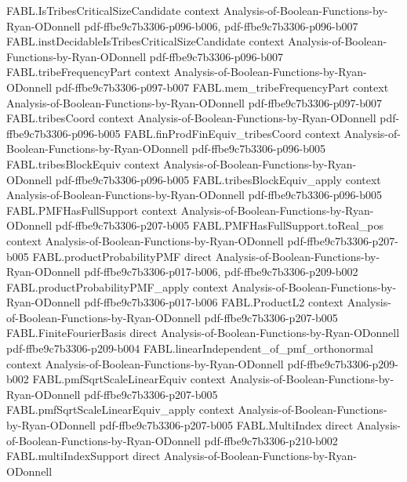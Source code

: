 \begin{theorem}
\proofstep
  {FABL.IsTribesCriticalSizeCandidate}
  {context}
  {Analysis-of-Boolean-Functions-by-Ryan-ODonnell}
  {pdf-ffbe9c7b3306-p096-b006,
    pdf-ffbe9c7b3306-p096-b007}
\proofstep
  {FABL.instDecidableIsTribesCriticalSizeCandidate}
  {context}
  {Analysis-of-Boolean-Functions-by-Ryan-ODonnell}
  {pdf-ffbe9c7b3306-p096-b007}
\proofstep
  {FABL.tribeFrequencyPart}
  {context}
  {Analysis-of-Boolean-Functions-by-Ryan-ODonnell}
  {pdf-ffbe9c7b3306-p097-b007}
\proofstep
  {FABL.mem_tribeFrequencyPart}
  {context}
  {Analysis-of-Boolean-Functions-by-Ryan-ODonnell}
  {pdf-ffbe9c7b3306-p097-b007}
\proofstep
  {FABL.tribesCoord}
  {context}
  {Analysis-of-Boolean-Functions-by-Ryan-ODonnell}
  {pdf-ffbe9c7b3306-p096-b005}
\proofstep
  {FABL.finProdFinEquiv_tribesCoord}
  {context}
  {Analysis-of-Boolean-Functions-by-Ryan-ODonnell}
  {pdf-ffbe9c7b3306-p096-b005}
\proofstep
  {FABL.tribesBlockEquiv}
  {context}
  {Analysis-of-Boolean-Functions-by-Ryan-ODonnell}
  {pdf-ffbe9c7b3306-p096-b005}
\proofstep
  {FABL.tribesBlockEquiv_apply}
  {context}
  {Analysis-of-Boolean-Functions-by-Ryan-ODonnell}
  {pdf-ffbe9c7b3306-p096-b005}
\proofstep
  {FABL.PMFHasFullSupport}
  {context}
  {Analysis-of-Boolean-Functions-by-Ryan-ODonnell}
  {pdf-ffbe9c7b3306-p207-b005}
\proofstep
  {FABL.PMFHasFullSupport.toReal_pos}
  {context}
  {Analysis-of-Boolean-Functions-by-Ryan-ODonnell}
  {pdf-ffbe9c7b3306-p207-b005}
\proofstep
  {FABL.productProbabilityPMF}
  {direct}
  {Analysis-of-Boolean-Functions-by-Ryan-ODonnell}
  {pdf-ffbe9c7b3306-p017-b006,
    pdf-ffbe9c7b3306-p209-b002}
\proofstep
  {FABL.productProbabilityPMF_apply}
  {context}
  {Analysis-of-Boolean-Functions-by-Ryan-ODonnell}
  {pdf-ffbe9c7b3306-p017-b006}
\proofstep
  {FABL.ProductL2}
  {context}
  {Analysis-of-Boolean-Functions-by-Ryan-ODonnell}
  {pdf-ffbe9c7b3306-p207-b005}
\proofstep
  {FABL.FiniteFourierBasis}
  {direct}
  {Analysis-of-Boolean-Functions-by-Ryan-ODonnell}
  {pdf-ffbe9c7b3306-p209-b004}
\proofstep
  {FABL.linearIndependent_of_pmf_orthonormal}
  {context}
  {Analysis-of-Boolean-Functions-by-Ryan-ODonnell}
  {pdf-ffbe9c7b3306-p209-b002}
\proofstep
  {FABL.pmfSqrtScaleLinearEquiv}
  {context}
  {Analysis-of-Boolean-Functions-by-Ryan-ODonnell}
  {pdf-ffbe9c7b3306-p207-b005}
\proofstep
  {FABL.pmfSqrtScaleLinearEquiv_apply}
  {context}
  {Analysis-of-Boolean-Functions-by-Ryan-ODonnell}
  {pdf-ffbe9c7b3306-p207-b005}
\proofstep
  {FABL.MultiIndex}
  {direct}
  {Analysis-of-Boolean-Functions-by-Ryan-ODonnell}
  {pdf-ffbe9c7b3306-p210-b002}
\proofstep
  {FABL.multiIndexSupport}
  {direct}
  {Analysis-of-Boolean-Functions-by-Ryan-ODonnell}

\end{theorem}
